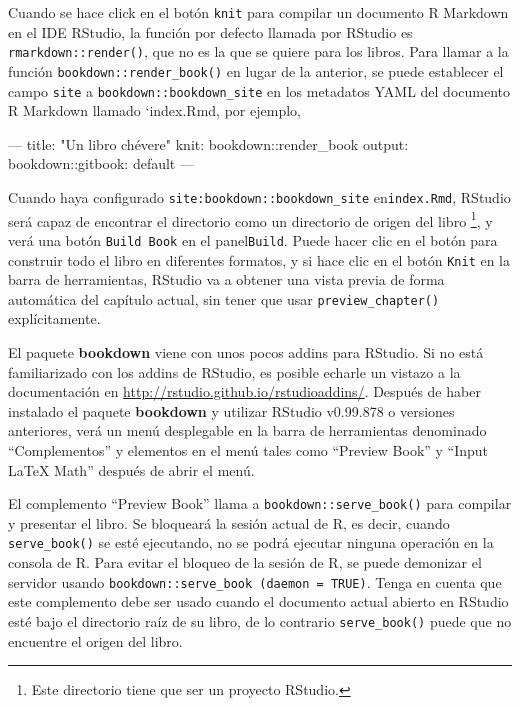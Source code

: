 \documentclass[12pt,]{krantz}
\makeatletter
\newenvironment{Shaded}{\begin{snugshade}}{\end{snugshade}}
\newcommand{\StringTok}[1]{\textcolor[rgb]{0.31,0.60,0.02}{#1}}
\newcommand{\OtherTok}[1]{\textcolor[rgb]{0.56,0.35,0.01}{#1}}
\newcommand{\FunctionTok}[1]{\textcolor[rgb]{0.00,0.00,0.00}{#1}}
\newcommand{\AttributeTok}[1]{\textcolor[rgb]{0.77,0.63,0.00}{#1}}
\newenvironment{kframe}{%
\medskip{}
\setlength{\fboxsep}{.8em}
 \def\at@end@of@kframe{}%
 \ifinner\ifhmode%
  \def\at@end@of@kframe{\end{minipage}}%
  \begin{minipage}{\columnwidth}%
 \fi\fi%
 \def\FrameCommand##1{\hskip\@totalleftmargin \hskip-\fboxsep
 \colorbox{shadecolor}{##1}\hskip-\fboxsep
     \hskip-\linewidth \hskip-\@totalleftmargin \hskip\columnwidth}%
 \MakeFramed {\advance\hsize-\width
   \@totalleftmargin\z@ \linewidth\hsize
   \@setminipage}}%
 {\par\unskip\endMakeFramed%
 \at@end@of@kframe}
\renewenvironment{Shaded}{\begin{kframe}}{\end{kframe}}
\theoremstyle{definition}
\theoremstyle{definition}
\theoremstyle{definition}
\theoremstyle{remark}
\makeatother
\begin{document}
Cuando se hace click en el botón \texttt{knit} para compilar un
documento R Markdown en el IDE RStudio, la función por defecto llamada
por RStudio es \texttt{rmarkdown::render()}, que no es la que se quiere
para los libros. Para llamar a la función
\texttt{bookdown::render\_book()} en lugar de la anterior, se puede
establecer el campo \texttt{site} a \texttt{bookdown::bookdown\_site} en
los metadatos YAML del documento R Markdown llamado `index.Rmd, por
ejemplo,

\begin{Shaded}
\begin{Highlighting}[]
\OtherTok{---}
\FunctionTok{title:}\AttributeTok{ }\StringTok{"Un libro chévere"}
\FunctionTok{knit:}\AttributeTok{ bookdown::render_book}
\FunctionTok{output:}
  \FunctionTok{bookdown:}\AttributeTok{:gitbook: default}
\OtherTok{---}
\end{Highlighting}
\end{Shaded}

Cuando haya configurado \texttt{site:bookdown::bookdown\_site}
en\texttt{index.Rmd}, RStudio será capaz de encontrar el directorio como
un directorio de origen del libro \footnote{Este directorio tiene que
  ser un proyecto RStudio.}, y verá una botón \texttt{Build\ Book} en el
panel\texttt{Build}. Puede hacer clic en el botón para construir todo el
libro en diferentes formatos, y si hace clic en el botón \texttt{Knit}
en la barra de herramientas, RStudio va a obtener una vista previa de
forma automática del capítulo actual, sin tener que usar
\texttt{preview\_chapter()} explícitamente.

El paquete \textbf{bookdown} viene con unos pocos addins para RStudio.
Si no está familiarizado con los addins de RStudio, es posible echarle
un vistazo a la documentación en
\url{http://rstudio.github.io/rstudioaddins/}. Después de haber
instalado el paquete \textbf{bookdown} y utilizar RStudio v0.99.878 o
versiones anteriores, verá un menú desplegable en la barra de
herramientas denominado ``Complementos'' y elementos en el menú tales
como ``Preview Book'' y ``Input LaTeX Math'' después de abrir el menú.

El complemento ``Preview Book'' llama a \texttt{bookdown::serve\_book()}
para compilar y presentar el libro. Se bloqueará la sesión actual de R,
es decir, cuando \texttt{serve\_book()} se esté ejecutando, no se podrá
ejecutar ninguna operación en la consola de R. Para evitar el bloqueo de
la sesión de R, se puede demonizar el servidor usando
\texttt{bookdown::serve\_book\ (daemon\ =\ TRUE)}. Tenga en cuenta que
este complemento debe ser usado cuando el documento actual abierto en
RStudio esté bajo el directorio raíz de su libro, de lo contrario
\texttt{serve\_book()} puede que no encuentre el origen del libro.
\end{document}
